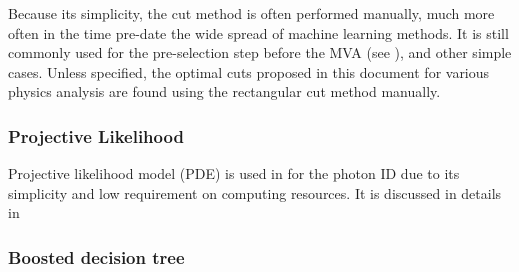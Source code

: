 Because its simplicity, the cut method is often performed manually, much more often in the time pre-date the wide spread of machine learning methods. It is still commonly used for the pre-selection step before the MVA (see ), and other simple cases. Unless specified, the optimal cuts proposed in this document for various physics analysis are found using the rectangular cut method manually.

\subsubsection{Projective Likelihood}

Projective likelihood model (PDE) is used in \pandora for the photon ID  due to its simplicity and low requirement on computing resources. It is discussed in details in 

\subsubsection{Boosted decision tree}
\label{sec:analysisBDT}


